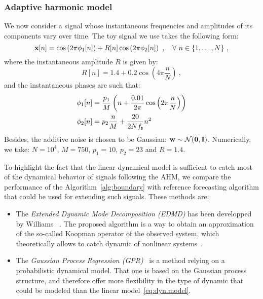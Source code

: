 \subsubsection{Adaptive harmonic model}
\label{ssse:res.ahm}
We now consider a signal whose instantaneous frequencies and amplitudes of its components vary over time. The toy signal we use takes the following form:
\[
\bx[n] = \cos\left(2\pi \phi_1[n] \right) + R[n]\cos\left(2\pi \phi_2[n] \right)\ ,\quad\forall\ n\in\{1,\ldots,N\} \ ,
\] 
where the instantaneous amplitude $R$ is given by:
\[
R[n] = 1.4 + 0.2\cos\left(4\pi\frac{n}{N}\right)\ ,
\]
and the instantaneous phases are such that:
\begin{align*}
\phi_1[n] &= \frac{p_1}{M}\left( n + \frac{0.01}{2\pi}\cos\left(2\pi\frac{n}{N}\right) \right) \\
\phi_2[n] & = p_2\frac{n}{M} + \frac{20}{2Nf_{\mathsf s}}n^2
\end{align*}
Besides, the additive noise is chosen to be Gaussian: ${\mathbf w}\sim{\mathcal N}(\boldsymbol{0},{\mathbf I})$. Numerically, we take: $N=10^4$, $M=750$, $p_1=10$, $p_2=23$ and $R=1.4$.

To highlight the fact that the linear dynamical model is sufficient to catch most of the dynamical behavior of signals following the AHM, we compare the performance of the Algorithm~\ref{alg:boundary} with reference forecasting algorithm that could be used for extending such signals. These methods are:
\begin{itemize}
\item The \emph{Extended Dynamic Mode Decomposition (EDMD)} has been developped by Williams \etal~\cite{Williams15data}. The proposed algorithm is a way to obtain an approximation of the so-called Koopman operator of the observed system, which theoretically allows to catch dynamic of nonlinear systems~\cite{Korda18linear}.
\item The \emph{Gaussian Process Regression (GPR)}~\cite{Rasmussen06gaussian} is a method relying on a probabilistic dynamical model. That one is based on the Gaussian process structure, and therefore offer more flexibility in the type of dynamic that could be modeled than the linear model~\eqref{eq:dyn.model}. 
\end{itemize}

